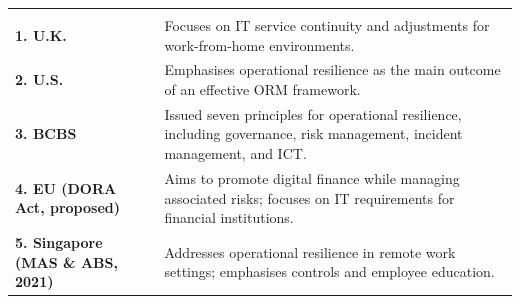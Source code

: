 \vspace{4pt}
\noindent\begin{minipage}{\textwidth}
\renewcommand{\arraystretch}{1.4}
\begin{tabularx}{\textwidth}{@{}L{0.22\textwidth}Y@{}}
  & \\
{\tabfont \textbf{1. U.K.}} & {\tabfont Focuses on IT service continuity and adjustments for work-from-home environments.}\\
{\tabfont \textbf{2. U.S.}} & {\tabfont Emphasises operational resilience as the main outcome of an effective ORM framework.}\\
{\tabfont \textbf{3. BCBS}} & {\tabfont Issued seven principles for operational resilience, including governance, risk management, incident management, and ICT.}\\
{\tabfont \textbf{4. EU (DORA Act, proposed)}} & {\tabfont Aims to promote digital finance while managing associated risks; focuses on IT requirements for financial institutions.}\\
{\tabfont \textbf{5. Singapore (MAS \& ABS, 2021)}} & {\tabfont Addresses operational resilience in remote work settings; emphasises controls and employee education.}\\
\end{tabularx}
\end{minipage}
